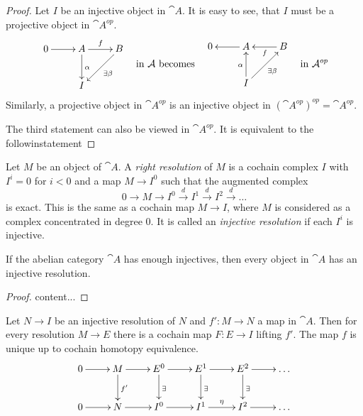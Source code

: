 \begin{proof}
	Let $I$ be an injective object in $\cat{A}$.
	It is easy to see, that $I$ must be a projective object in $\cat{A}^{op}$.
	\[
		\vcenter{\xymatrix{
			0 \ar[r] &A \ar[r]^f \ar[d]^\alpha & B \ar[ld]^{\exists\beta} \\
			&I
		}}
		\quad\text{in $\cat{A}$ becomes}\quad
		\vcenter{\xymatrix{
			0  &A \ar[l]   & B \ar[l]^f  \\
			&I \ar[u]^\alpha \ar[ru]_{\exists\beta}
		}}
	\quad\text{in $\cat{A}^{op}$}
	\]
	Similarly, a projective object in $\cat{A}^{op}$ is an injective object in $(\cat{A}^{op})^{op} = \cat{A}^{op}$.
	
	The third statement can also be viewed in $\cat{A}^{op}$.
	It is equivalent to the followinstatement
\end{proof}

\begin{definition}
	Let $M$ be an object of $\cat{A}$.
	A \textit{right resolution} of $M$ is a cochain complex $I$ with $I^i=0$ for $i<0$ and a map $M\rightarrow I^0$ such that the augmented complex
	$$0 \rightarrow M \rightarrow I^0 \overset{d}{\rightarrow} I^1 \overset{d}{\rightarrow} I^2 \overset{d}{\rightarrow} \dots$$
	is exact.
	This is the same as a cochain map $M\rightarrow I$, where $M$ is considered as a complex concentrated in degree $0$.
	It is called an \textit{injective resolution} if each $I^i$ is injective.
\end{definition}

\begin{lemma}
	If the abelian category $\cat{A}$ has enough injectives, then every object in $\cat{A}$ has an injective resolution.
\end{lemma}

\begin{proof}
	content...
\end{proof}

\begin{theorem}
	Let $N\rightarrow I$ be an injective resolution of $N$ and $f':M\rightarrow N$ a map in $\cat{A}$. Then for every resolution $M\rightarrow E$ there is a cochain map $F:E\rightarrow I$ lifting $f'$.
	The map $f$ is unique up to cochain homotopy equivalence.
	\begin{align*}
		\xymatrix{
			0 \ar[r] &M \ar[r] \ar[d]^{f'} &E^0 \ar[r] \ar[d]^{\exists} &E^1 \ar[r] \ar[d]^{\exists} &E^2 \ar[r] \ar[d]^{\exists} &\dots \\
			0 \ar[r] &N \ar[r] &I^0 \ar[r] &I^1 \ar[r]^{\eta} &I^2 \ar[r] &\dots
		}
	\end{align*}
\end{theorem}

